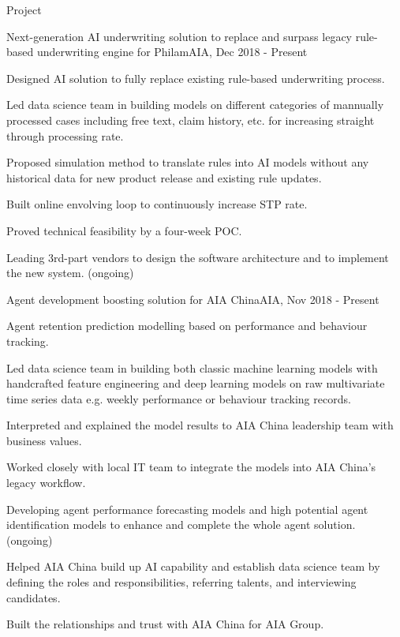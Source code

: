 \documentclass{resume} %
\begin{document}
\begin{rSection}{Project}

\begin{rSubsection}{Next-generation AI underwriting solution to replace and surpass legacy rule-based underwriting engine for Philam}{}{AIA, Dec 2018 - Present}{}
\item Designed AI solution to fully replace existing rule-based underwriting process.
\item Led data science team in building models on different categories of mannually processed cases including free text, claim history, etc. for increasing straight through processing rate.
\item Proposed simulation method to translate rules into AI models without any historical data for new product release and existing rule updates.
\item Built online envolving loop to continuously increase STP rate.
\item Proved technical feasibility by a four-week POC.
\item Leading 3rd-part vendors to design the software architecture and to implement the new system. (ongoing)
\end{rSubsection}


\begin{rSubsection}{Agent development boosting solution for AIA China}{}{AIA, Nov 2018 - Present}{}
\item Agent retention prediction modelling based on performance and behaviour tracking.
\item Led data science team in building both classic machine learning models with handcrafted feature engineering and deep learning models on raw multivariate time series data e.g. weekly performance or behaviour tracking records.
\item Interpreted and explained the model results to AIA China leadership team with business values.
\item Worked closely with local IT team to integrate the models into AIA China's legacy workflow.
\item Developing agent performance forecasting models and high potential agent identification models to enhance and complete the whole agent solution. (ongoing)
\item Helped AIA China build up AI capability and establish data science team by defining the roles and responsibilities, referring talents, and interviewing candidates.
\item Built the relationships and trust with AIA China for AIA Group.
\end{rSubsection}


\end{rSection}
\end{document}
